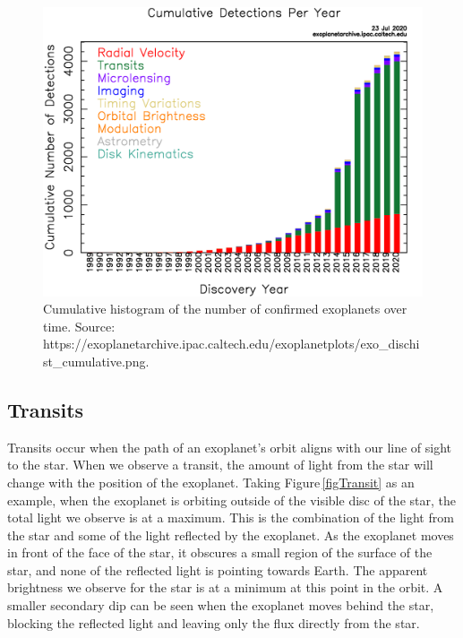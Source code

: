 \begin{figure}
    \centering
    \includegraphics[width=\textwidth]{exo_dischist_cumulative.png}
    \caption{Cumulative histogram of the number of confirmed exoplanets over time. 
    Source: https://exoplanetarchive.ipac.caltech.edu/exoplanetplots/exo\_dischist\_cumulative.png.}
    \label{figExoHist}
\end{figure}

\subsection{Transits}
\label{secTrans}
Transits occur when the path of an exoplanet's orbit aligns with our line of sight to the star. When we observe a transit, the amount of light from the star will change with the position of the exoplanet. Taking Figure\,\ref{figTransit} as an example, when the exoplanet is orbiting outside of the visible disc of the star, the total light we observe is at a maximum. This is the combination of the light from the star and some of the light reflected by the exoplanet. As the exoplanet moves in front of the face of the star, it obscures a small region of the surface of the star, and none of the reflected light is pointing towards Earth. The apparent brightness we observe for the star is at a minimum at this point in the orbit. A smaller secondary dip can be seen when the exoplanet moves behind the star, blocking the reflected light and leaving only the flux directly from the star.\\

